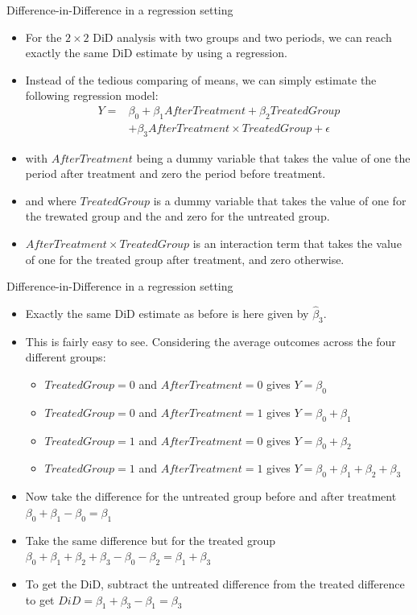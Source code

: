 \documentclass[notes,11pt, aspectratio=169]{beamer}
\begin{document}
\begin{frame}{Difference-in-Difference in a regression setting}
\begin{itemize}
\item For the $2\times2$ DiD analysis with two groups and two periods, we can reach exactly the same DiD estimate by using a regression.
\item Instead of the tedious comparing of means, we can simply estimate the following regression model:
\begin{align}
Y = &\beta_0 + \beta_1 AfterTreatment + \beta_2 TreatedGroup\\ \nonumber
&+ \beta_3 AfterTreatment \times TreatedGroup + \epsilon
\end{align}
\item with  $AfterTreatment$ being a dummy variable that takes the value of one the period after treatment and zero the period before treatment.
\item and where $TreatedGroup$ is a dummy variable that takes the value of one for the trewated group and the and zero for the untreated group. 
\item  $AfterTreatment \times TreatedGroup$ is an interaction term that takes the value of one for the treated group after treatment, and zero otherwise.
\end{itemize}
\end{frame}

\begin{frame}{Difference-in-Difference in a regression setting}
\begin{itemize}
\item Exactly the same DiD estimate as before is here given by $\hat{\beta}_3$.
\item This is fairly easy to see. Considering the average outcomes across the four different groups: 
    \begin{itemize}
    \item $TreatedGroup=0$ and $AfterTreatment=0$ gives $Y=\beta_0$ 
    \item $TreatedGroup=0$ and $AfterTreatment=1$ gives $Y=\beta_0 + \beta_1$ 
    \item $TreatedGroup=1$ and $AfterTreatment=0$ gives $Y=\beta_0 + \beta_2$ 
    \item $TreatedGroup=1$ and $AfterTreatment=1$ gives $Y=\beta_0+\beta_1+\beta_2+\beta_3$ 
    \end{itemize}
\item Now take the difference for the untreated group before and after treatment  $\beta_0 +\beta_1 -\beta_0 = \beta_1$
\item Take the same difference but for the treated group  $\beta_0 +\beta_1 +\beta_2 + \beta_3 - \beta_0 -\beta_2= \beta_1+\beta_3$
\item To get the DiD, subtract the untreated difference from the treated difference to get $DiD = \beta_1 + \beta_3 - \beta_1 = \beta_3$
\end{itemize}
\end{frame}
\end{document}
